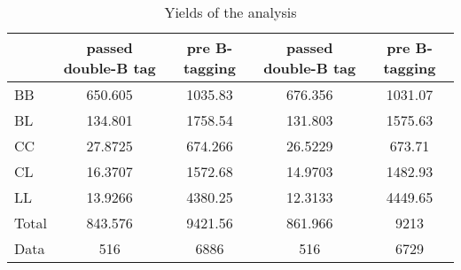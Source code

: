 \documentclass[10pt]{article}
\begin{document}
\begin{table}[htbp]
\begin{center}
\begin{tabular}{|l|S|S|S|S|}
\hline 
 & {passed double-B tag} & {pre B-tagging} & {passed double-B tag} & {pre B-tagging}\\
\hline 
  BB   & 650.605  & 1035.83  & 676.356  & 1031.07  \\ 
  BL   & 134.801  & 1758.54  & 131.803  & 1575.63  \\ 
  CC   & 27.8725  & 674.266  & 26.5229  & 673.71  \\ 
  CL   & 16.3707  & 1572.68  & 14.9703  & 1482.93  \\ 
  LL   & 13.9266  & 4380.25  & 12.3133  & 4449.65  \\ 
\hline 
  Total  & 843.576  & 9421.56  & 861.966  & 9213  \\ 
\hline 
  Data   & 516 & 6886 & 516 & 6729 \\ 
\hline 
\end{tabular} 
\caption{Yields of the analysis} 
\end{center} 
\end{table} 
\end{document}
